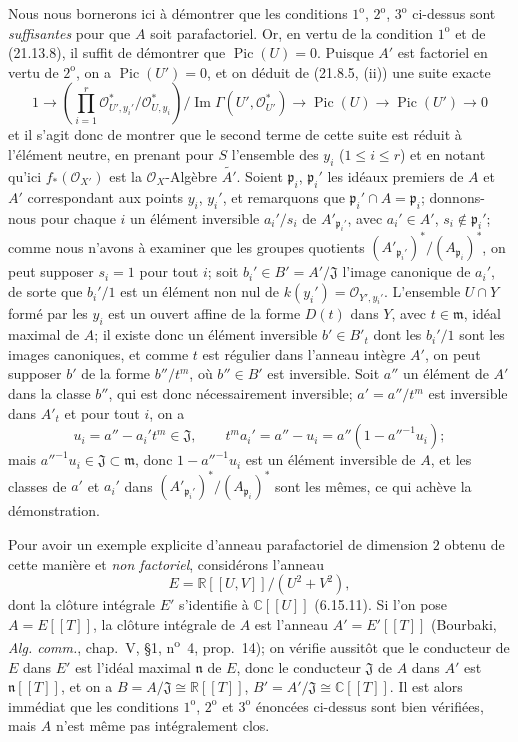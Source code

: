 \begin{env}[21.13.9]
Nous nous bornerons ici à démontrer que les conditions $1^{\mathrm o}$,
$2^{\mathrm o}$, $3^{\mathrm o}$ ci-dessus sont \emph{suffisantes} pour que $A$ soit
parafactoriel. Or, en vertu de la condition $1^{\mathrm o}$ et de (21.13.8), il suffit
de démontrer que $\operatorname{Pic}(U)=0$. Puisque $A'$ est factoriel en vertu de
$2^{\mathrm o}$, on a $\operatorname{Pic}(U')=0$, et on déduit de (21.8.5, (ii)) une
suite exacte
\[
  1\longrightarrow
  \left(\prod_{i=1}^r
  \mathcal O_{U',y_i'}^*/\mathcal O_{U,y_i}^*\right)
  \big/\operatorname{Im}\Gamma(U',\mathcal O_{U'}^*)
  \longrightarrow\operatorname{Pic}(U)\longrightarrow\operatorname{Pic}(U')
  \longrightarrow0
\]
et il s'agit donc de montrer que le second terme de cette suite est réduit à l'élément
neutre, en prenant pour $S$ l'ensemble des $y_i$ ($1\leq i\leq r$) et en notant
qu'ici $f_*(\mathcal O_{X'})$ est la $\mathcal O_X$-Algèbre $\widetilde{A'}$. Soient
$\mathfrak p_i$, $\mathfrak p_i'$ les idéaux premiers de $A$ et $A'$ correspondant
aux points $y_i$, $y_i'$, et remarquons que $\mathfrak p_i'\cap A=\mathfrak p_i$;
donnons-nous pour chaque $i$ un élément inversible $a_i'/s_i$ de
$A'_{\mathfrak p_i'}$, avec $a_i'\in A'$, $s_i\notin\mathfrak p_i'$; comme nous
n'avons à examiner que les groupes quotients
$(A'_{\mathfrak p_i'})^*/(A_{\mathfrak p_i})^*$, on peut supposer $s_i=1$ pour tout
$i$; soit $b_i'\in B'=A'/\mathfrak J$ l'image canonique de $a_i'$, de sorte que
$b_i'/1$ est un élément non nul de $k(y_i')=\mathcal O_{Y',y_i'}$. L'ensemble
$U\cap Y$ formé par les $y_i$ est un ouvert affine de la forme $D(t)$ dans $Y$, avec
$t\in\mathfrak m$, idéal maximal de $A$; il existe donc un élément inversible
$b'\in B'_t$ dont les $b_i'/1$ sont les images canoniques, et comme $t$ est régulier
dans l'anneau intègre $A'$, on peut supposer $b'$ de la forme $b''/t^m$, où
$b''\in B'$ est inversible. Soit $a''$ un élément de $A'$ dans la classe $b''$, qui
est donc nécessairement inversible; $a'=a''/t^m$ est inversible dans $A'_t$ et pour
tout $i$, on a
\[
  u_i=a''-a_i't^m\in\mathfrak J,
  \qquad
  t^m a_i'=a''-u_i=a''(1-a''^{-1}u_i);
\]
mais $a''^{-1}u_i\in\mathfrak J\subset\mathfrak m$, donc $1-a''^{-1}u_i$ est un
élément inversible de $A$, et les classes de $a'$ et $a_i'$ dans
$(A'_{\mathfrak p_i'})^*/(A_{\mathfrak p_i})^*$ sont les mêmes, ce qui achève la
démonstration.

Pour avoir un exemple explicite d'anneau parafactoriel de dimension $2$ obtenu de
cette manière et \emph{non factoriel}, considérons l'anneau
\[
  E=\mathbb R[[U,V]]/(U^2+V^2),
\]
dont la clôture intégrale $E'$ s'identifie à $\mathbb C[[U]]$ (6.15.11). Si l'on pose
$A=E[[T]]$, la clôture intégrale de $A$ est l'anneau $A'=E'[[T]]$ (Bourbaki,
\emph{Alg. comm.}, chap.~V, \S1, n\textsuperscript{o}~4, prop.~14); on vérifie
aussitôt que le conducteur de $E$ dans $E'$ est l'idéal maximal $\mathfrak n$ de
$E$, donc le conducteur $\mathfrak J$ de $A$ dans $A'$ est $\mathfrak n[[T]]$, et on
a $B=A/\mathfrak J\cong\mathbb R[[T]]$, $B'=A'/\mathfrak J\cong\mathbb C[[T]]$.
Il est alors immédiat que les conditions $1^{\mathrm o}$, $2^{\mathrm o}$ et
$3^{\mathrm o}$ énoncées ci-dessus sont bien vérifiées, mais $A$ n'est même pas
intégralement clos.


\end{env}
